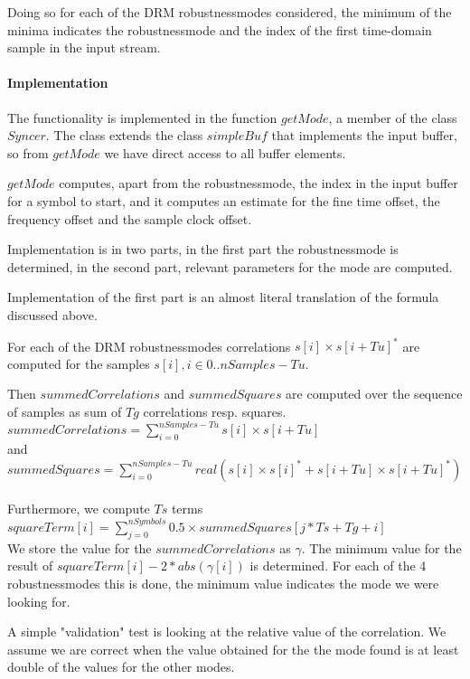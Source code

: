 \documentclass[11pt]{article}
\begin{document}
Doing so for each of the DRM robustnessmodes considered,
the minimum of the minima 
indicates the  robustnessmode and the index of the first time-domain
sample in the input stream.

\paragraph{Implementation}
The functionality is implemented in the function $getMode$, a member of
the class $Syncer$.
The class extends the class $simpleBuf$ that implements the input buffer,
so from $getMode$ we have direct access to all buffer elements.

$getMode$ computes, apart from the robustnessmode, the index
in the input buffer for a symbol to start, and it computes an
estimate for the fine time offset,
the frequency offset and the sample clock offset.

Implementation is in two parts, in the first part the robustnessmode
is determined,
in the second part, relevant parameters for the mode are computed.

Implementation  of the first part is an almost literal translation of
the formula discussed above.

For each of the DRM robustnessmodes correlations $s [i] \times s [i + Tu]^*$
are computed for the samples $s [i], i \in 0 .. nSamples - Tu$.

Then  $summedCorrelations$ and $summedSquares$ are computed over
the sequence of samples as sum of $Tg$ correlations resp. squares.
{
\ \\
$summedCorrelations = \sum_{i=0}^{nSamples - Tu} s [i] \times s [i + Tu]$
\ \\
}
and
{
\ \\
$summedSquares = \sum_{i=0}^{nSamples - Tu} real (s [i] \times s [i]^* +
                            s[i + Tu] \times s [i + Tu]^*)$
\ \\
}
Furthermore, we compute $Ts$ terms
{
\ \\
$squareTerm[i] = \sum_{j=0}^{nSymbols} 0.5 \times summedSquares [j * Ts + Tg + i]$
\ \\
}
We store the value for the $summedCorrelations$ as $\gamma$.
The minimum value for
the result of $squareTerm [i] - 2 * abs (\gamma [i])$ is determined.
For each of the 4 robustnessmodes this is done, the minimum value indicates the 
mode we were looking for.

A simple "validation" test is looking at the relative value
of the correlation. We assume we are correct when the value
obtained for the the mode found is at least double of the values
for the other modes.
\end{document}

